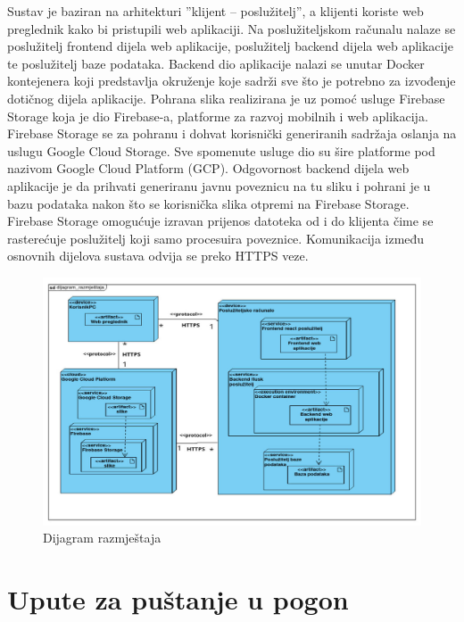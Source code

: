 			 Sustav je baziran na arhitekturi ”klijent – poslužitelj”, a klijenti koriste web preglednik kako bi pristupili web aplikaciji. Na poslužiteljskom računalu nalaze se poslužitelj frontend dijela web aplikacije, poslužitelj backend dijela web aplikacije te poslužitelj baze podataka. Backend dio aplikacije nalazi se unutar Docker kontejenera koji predstavlja okruženje koje sadrži sve što je potrebno za izvođenje dotičnog dijela aplikacije. Pohrana slika realizirana je uz pomoć usluge Firebase Storage koja je dio Firebase-a, platforme za razvoj mobilnih i web aplikacija. Firebase Storage se za pohranu i dohvat korisnički generiranih sadržaja oslanja na uslugu Google Cloud Storage. Sve spomenute usluge dio su šire platforme pod nazivom Google Cloud Platform (GCP). Odgovornost backend dijela web aplikacije je da prihvati generiranu javnu poveznicu na tu sliku i pohrani je u bazu podataka nakon što se korisnička slika otpremi na Firebase Storage. Firebase Storage omogućuje izravan prijenos datoteka od i do klijenta čime se rasterećuje poslužitelj koji samo procesuira poveznice. Komunikacija između osnovnih dijelova sustava odvija se preko HTTPS veze.
			 \begin{figure}[htbp]
				\centering
				\includegraphics[width=1\textwidth]{dijagrami/diagram_razmjestaja_new2.jpeg}
				\caption{Dijagram razmještaja}
			\label{fig:my_image}
			\end{figure}
			\eject 
		
		\section{Upute za puštanje u pogon}
		
